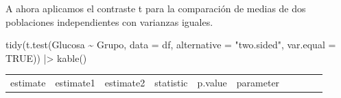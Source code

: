 \documentclass[
  a4paper,
]{scrreport}
\newenvironment{Shaded}{\begin{snugshade}}{\end{snugshade}}
\newcommand{\AttributeTok}[1]{\textcolor[rgb]{0.40,0.45,0.13}{#1}}
\newcommand{\ConstantTok}[1]{\textcolor[rgb]{0.56,0.35,0.01}{#1}}
\newcommand{\FunctionTok}[1]{\textcolor[rgb]{0.28,0.35,0.67}{#1}}
\newcommand{\NormalTok}[1]{\textcolor[rgb]{0.00,0.23,0.31}{#1}}
\newcommand{\SpecialCharTok}[1]{\textcolor[rgb]{0.37,0.37,0.37}{#1}}
\newcommand{\StringTok}[1]{\textcolor[rgb]{0.13,0.47,0.30}{#1}}
\theoremstyle{definition}
\theoremstyle{remark}
\begin{document}
\begin{tcolorbox}
A ahora aplicamos el contraste t para la comparación de medias de dos
poblaciones independientes con varianzas iguales.

\begin{Shaded}
\begin{Highlighting}[]
\FunctionTok{tidy}\NormalTok{(}\FunctionTok{t.test}\NormalTok{(Glucosa }\SpecialCharTok{\textasciitilde{}}\NormalTok{ Grupo, }\AttributeTok{data =}\NormalTok{ df, }\AttributeTok{alternative =} \StringTok{"two.sided"}\NormalTok{, }\AttributeTok{var.equal =} \ConstantTok{TRUE}\NormalTok{)) }\SpecialCharTok{|\textgreater{}} 
    \FunctionTok{kable}\NormalTok{()}
\end{Highlighting}
\end{Shaded}

\begin{longtable}[]{@{}
  >{\raggedleft\arraybackslash}p{}
  >{\raggedleft\arraybackslash}p{}
  >{\raggedleft\arraybackslash}p{}
  >{\raggedleft\arraybackslash}p{}
  >{\raggedleft\arraybackslash}p{}
  >{\raggedleft\arraybackslash}p{}
  >{\raggedleft\arraybackslash}p{}
  >{\raggedleft\arraybackslash}p{}
  >{\raggedright\arraybackslash}p{}
  >{\raggedright\arraybackslash}p{}@{}}
\toprule\noalign{}
\begin{minipage}[b]{\linewidth}\raggedleft
estimate
\end{minipage} & \begin{minipage}[b]{\linewidth}\raggedleft
estimate1
\end{minipage} & \begin{minipage}[b]{\linewidth}\raggedleft
estimate2
\end{minipage} & \begin{minipage}[b]{\linewidth}\raggedleft
statistic
\end{minipage} & \begin{minipage}[b]{\linewidth}\raggedleft
p.value
\end{minipage} & \begin{minipage}[b]{\linewidth}\raggedleft
parameter
\end{minipage} & \begin{minipage}[b]{\linewidth}\raggedleft

\end{minipage}
\end{longtable}
\end{tcolorbox}
\end{document}
